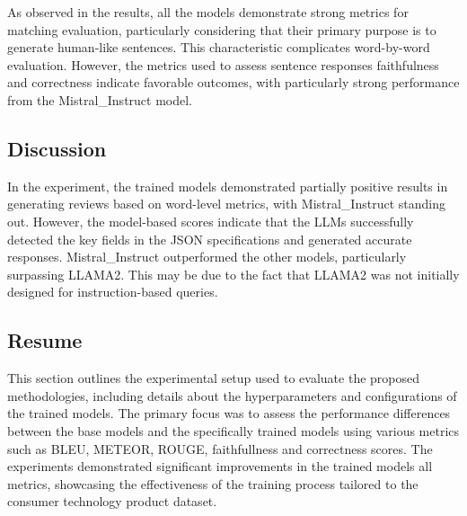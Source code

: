 As observed in the results, all the models demonstrate strong metrics for matching evaluation, particularly considering that their primary purpose is to generate human-like sentences. This characteristic complicates word-by-word evaluation. However, the metrics used to assess sentence responses faithfulness and correctness indicate favorable outcomes, with particularly strong performance from the Mistral\_Instruct model.
\subsection{Discussion}
In the experiment, the trained models demonstrated partially positive results in generating reviews based on word-level metrics, with Mistral\_Instruct standing out. However, the model-based scores indicate that the LLMs successfully detected the key fields in the JSON specifications and generated accurate responses. Mistral\_Instruct outperformed the other models, particularly surpassing LLAMA2. This may be due to the fact that LLAMA2 was not initially designed for instruction-based queries.

\subsection{Resume}
This section outlines the experimental setup used to evaluate the proposed methodologies, including details about the hyperparameters and configurations of the trained models. The primary focus was to assess the performance differences between the base models and the specifically trained models using various metrics such as BLEU, METEOR, ROUGE, faithfullness and correctness scores. The experiments demonstrated significant improvements in the trained models all metrics, showcasing the effectiveness of the training process tailored to the consumer technology product dataset.
